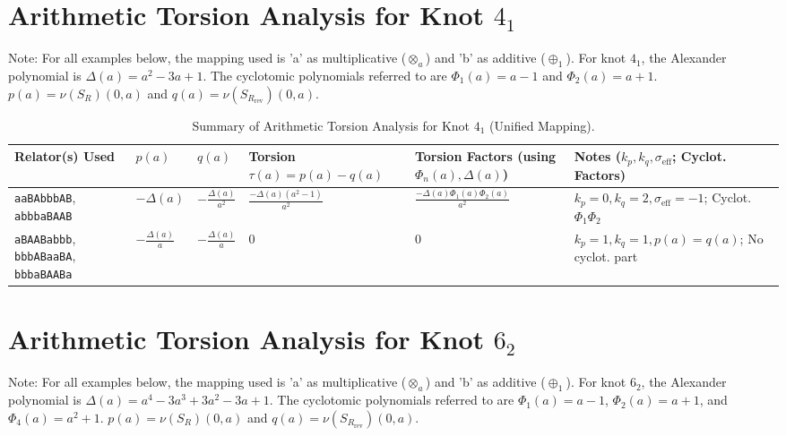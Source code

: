 \documentclass{article}
\begin{document}
\section*{Arithmetic Torsion Analysis for Knot $4_1$}

\noindent Note: For all examples below, the mapping used is 'a' as multiplicative ($\otimes_a$) and 'b' as additive ($\oplus_1$).
For knot $4_1$, the Alexander polynomial is $\Delta(a) = a^2 - 3a + 1$.
The cyclotomic polynomials referred to are $\Phi_1(a) = a-1$ and $\Phi_2(a) = a+1$.
$p(a) = \nu(S_R)(0,a)$ and $q(a) = \nu(S_{R_{\text{rev}}})(0,a)$.

\begin{table}[htbp]
\centering
\caption{Summary of Arithmetic Torsion Analysis for Knot $4_1$ (Unified Mapping).}
\label{tab:knot41_unified_mapping_new_data}
\scriptsize %
\begin{tabular}{@{}p{3.2cm} p{2.0cm} p{2.0cm} p{2.5cm} p{3.3cm} p{3.3cm}@{}}
\toprule
\textbf{Relator(s) Used} & \textbf{$p(a)$} & \textbf{$q(a)$} & \textbf{Torsion $\tau(a) = p(a) - q(a)$} & \textbf{Torsion Factors} (using $\Phi_n(a), \Delta(a)$) & \textbf{Notes} ($k_p, k_q, \sigma_{\text{eff}}$; Cyclot. Factors) \\
\midrule
\texttt{aaBAbbbAB}, \texttt{abbbaBAAB} & $-\Delta(a)$ & $-\frac{\Delta(a)}{a^2}$ & $\frac{-\Delta(a)(a^2-1)}{a^2}$ & $\frac{-\Delta(a) \Phi_1(a) \Phi_2(a)}{a^2}$ & $k_p=0, k_q=2, \sigma_{\text{eff}}=-1$; Cyclot. $\Phi_1\Phi_2$ \\
\addlinespace
\texttt{aBAABabbb}, \texttt{bbbABaaBA}, \texttt{bbbaBAABa} & $-\frac{\Delta(a)}{a}$ & $-\frac{\Delta(a)}{a}$ & $0$ & $0$ & $k_p=1, k_q=1, p(a)=q(a)$; No cyclot. part \\
\bottomrule
\end{tabular}
\end{table}

\vspace{1cm} %

\section*{Arithmetic Torsion Analysis for Knot $6_2$}

\noindent Note: For all examples below, the mapping used is 'a' as multiplicative ($\otimes_a$) and 'b' as additive ($\oplus_1$).
For knot $6_2$, the Alexander polynomial is $\Delta(a) = a^4 - 3a^3 + 3a^2 - 3a + 1$.
The cyclotomic polynomials referred to are $\Phi_1(a) = a-1$, $\Phi_2(a) = a+1$, and $\Phi_4(a) = a^2+1$.
$p(a) = \nu(S_R)(0,a)$ and $q(a) = \nu(S_{R_{\text{rev}}})(0,a)$.
\end{document}
